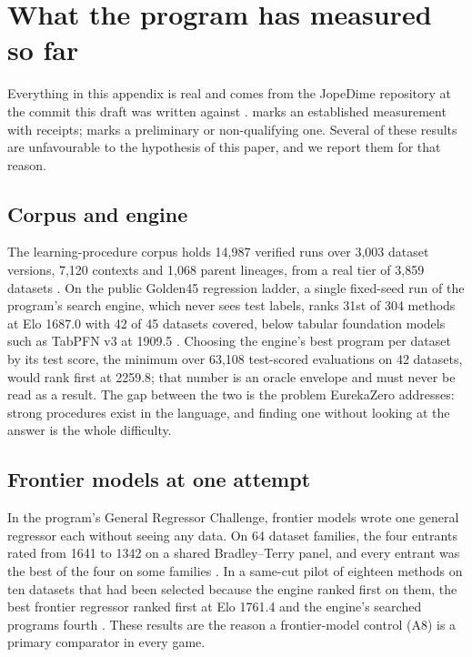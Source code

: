 \section{What the program has measured so far}
\label{app:history}

Everything in this appendix is real and comes from the JopeDime repository at the commit this draft
was written against \citep{jopedime2026repo,jopedime2026innovationzero,jopedime2026experiments}.
\est{} marks an established measurement with receipts; \pre{} marks a preliminary or non-qualifying
one. Several of these results are unfavourable to the hypothesis of this paper, and we report them
for that reason.

\subsection{Corpus and engine}

The learning-procedure corpus holds 14,987 verified runs over 3,003 dataset versions, 7,120
contexts and 1,068 parent lineages, from a real tier of 3,859 datasets \est. On the public Golden45
regression ladder, a single fixed-seed run of the program's search engine, which never sees test
labels, ranks 31st of 304 methods at Elo 1687.0 with 42 of 45 datasets covered, below tabular
foundation models such as TabPFN v3 at 1909.5 \est. Choosing the engine's best program per dataset by
its test score, the minimum over 63,108 test-scored evaluations on 42 datasets, would rank first at
2259.8; that number is an oracle envelope and must never be read as a result. The gap between the
two is the problem EurekaZero addresses: strong procedures exist in the language, and finding one
without looking at the answer is the whole difficulty.

\subsection{Frontier models at one attempt}

In the program's General Regressor Challenge, frontier models wrote one general regressor each
without seeing any data. On 64 dataset families, the four entrants rated from 1641 to 1342 on a
shared Bradley--Terry panel, and every entrant was the best of the four on some families
\pre{} \citep{jopedime2026challenge,jopedime2026writeup}. In a same-cut pilot of eighteen methods on
ten datasets that had been selected because the engine ranked first on them, the best frontier
regressor ranked first at Elo 1761.4 and the engine's searched programs fourth \pre. These results
are the reason a frontier-model control (A8) is a primary comparator in every game.


